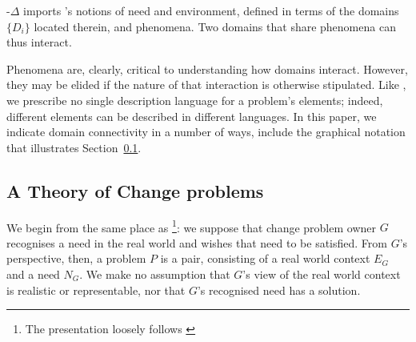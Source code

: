 \documentclass[runningheads,a4paper]{llncs}
\begin{document}
\POE{}-$\Delta$ imports \POE{}'s notions of need and environment, defined in terms of the domains $\{D_i\}$ located therein, and phenomena. Two domains that share phenomena can thus interact. 



Phenomena are, clearly, critical to understanding how domains interact. However, they may be elided if the nature of that interaction is otherwise stipulated. Like \POE{}, we prescribe no single description language for a problem's elements; indeed, different elements can be described in different languages. In this paper, we indicate domain connectivity in a number of ways, include the graphical notation that illustrates Section~\ref{sect:ChangeProblemSolving}.

\subsection{A Theory of Change problems}
\label{sect:ChangeProblemSolving}

We begin from the same place as \POE{}\footnote{The presentation loosely follows \cite{hall2016a-design}}: we suppose that change problem owner $G$ recognises a need in the real world and wishes that need to be satisfied. From $G$'s perspective, then, a  problem $P$ is a pair, consisting of a real world context $E_G$ and a need $N_G$. We make no assumption that $G$'s view of the real world context is realistic or representable, nor that $G$'s recognised need has a solution. 
\end{document}
